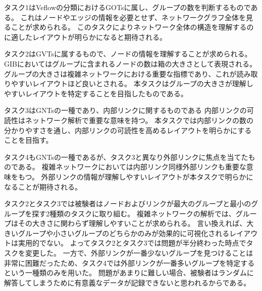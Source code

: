 \documentclass{kuee}
\begin{document}
タスク1はVeflowの分類におけるGOTsに属し、グループの数を判断するものである。
これはノードやエッジの情報を必要とせず、ネットワークグラフ全体を見ることが求められる。
このタスクによりネットワーク全体の構造を理解するのに適したレイアウトが明らかになると期待される。

タスク2はGVTsに属するもので、ノードの情報を理解することが求められる。
GIBにおいてはグループに含まれるノードの数は箱の大きさとして表現される。
グループの大きさは複雑ネットワークにおける重要な指標であり、これが読み取りやすいレイアウトほど良いとされる。
本タスクはグループの大きさが理解しやすいレイアウトを特定することを目指したものである。

タスク3はGNTsの一種であり、内部リンクに関するものである
内部リンクの可読性はネットワーク解析で重要な意味を持つ。
本タスクでは内部リンクの数の分かりやすさを通し、内部リンクの可読性を高めるレイアウトを明らかにすることを目指す。

タスク4もGNTsの一種であるが、タスク3と異なり外部リンクに焦点を当てたものである。
複雑ネットワークにおいては内部リンク同様外部リンクも重要な意味をもつ。
外部リンクの情報が理解しやすいレイアウトが本タスクで明らかになることが期待される。

タスク2とタスク3では被験者はノードおよびリンクが最大のグループと最小のグループを探す2種類のタスクに取り組む。
複雑ネットワークの解析では、グループはその大きさに関わらず理解しやすいことが求められる。
言い換えれば、大きいグループや小さいグループのどちらかのみが効果的に可視化されるレイアウトは実用的でない。
よってタスク2とタスク3では問題が半分終わった時点でタスクを変更した。
一方で、外部リンクが一番少ないグループを見つけることは非常に困難だったため、タスク4では外部リンクが一番多いグループを特定するという一種類のみを用いた。
問題があまりに難しい場合、被験者はランダムに解答してしまうために有意義なデータが記録できないと思われるからである。
\end{document}
